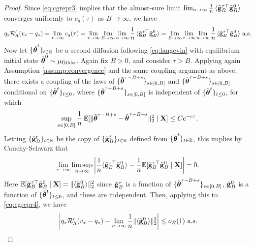 \begin{proof}
Since \eqref{eq:cgrepr3} implies that the almost-sure limit
$\lim_{n \to \infty} \frac{1}{n}\,\langle
\tilde {\mathbf{g}}_B^{\tau\top}\tilde {\mathbf{g}}_B^0 \rangle$ converges uniformly to
$c_g(\tau)$ as $B \to \infty$, we have
\begin{equation}\label{eq:cgrepr4}
q_*\mathcal{R}_\Lambda'(v_*-q_*)=\lim_{\tau \to \infty} c_g(\tau)=
\lim_{\tau \to \infty} \lim_{B \to \infty}
\lim_{n \to \infty}
\frac{1}{n}\,\langle \tilde {\mathbf{g}}_B^{\tau\top}\tilde {\mathbf{g}}_B^0 \rangle
=\lim_{B \to \infty}
\lim_{\tau \to \infty} \lim_{n \to \infty}
\frac{1}{n}\,\langle \tilde {\mathbf{g}}_B^{\tau\top}\tilde {\mathbf{g}}_B^0 \rangle \text{ a.s.}
\end{equation}
Now let $\{\check {\boldsymbol{\theta}}^t\}_{t \in \mathbb{R}}$ be a second diffusion following
\eqref{eq:langevin} with equilibrium
initial state $\check {\boldsymbol{\theta}}^0 \sim \mu_{\mathrm{Gibbs}}$. Again fix $B>0$, and
consider $\tau>B$. Applying again
Assumption \ref{assump:convergence} and the same coupling argument as above,
there exists a coupling of the laws of $\{\tilde {\boldsymbol{\theta}}^{\tau-B+s}\}_{s \in
[0,B]}$ and $\{\check{\boldsymbol{\theta}}^{\tau-B+s}\}_{s \in [0,B]}$ 
conditional on $\{\tilde{\boldsymbol{\theta}}^t\}_{t \leq 0}$,
where $\{\check{\boldsymbol{\theta}}^{\tau-B+s}\}_{s \in [0,B]}$ is independent of
$\{\tilde{\boldsymbol{\theta}}^t\}_{t \leq 0}$, for which
\[\sup_{s \in [0,B]} \frac{1}{n}\,\mathbb{E}[\|\tilde {\boldsymbol{\theta}}^{\tau-B+s}
-\check{\boldsymbol{\theta}}^{\tau-B+s}\|_2^2 \mid \mathbf{X}] \leq Ce^{-c\tau}.\]
Letting $\{\check {\mathbf{g}}_B^t\}_{t \in \mathbb{R}}$ be the copy of $\{\tilde {\mathbf{g}}_B^t\}_{t \in
\mathbb{R}}$ defined from $\{\check {\boldsymbol{\theta}}^t\}_{t \in \mathbb{R}}$,
this implies by Cauchy-Schwarz that
\[\lim_{\tau \to \infty} \limsup_{n \to \infty}
\left|\frac{1}{n}\langle \tilde {\mathbf{g}}_B^{\tau\top}\tilde {\mathbf{g}}_B^0 \rangle
-\frac{1}{n}\mathbb{E}[\check {\mathbf{g}}_B^{\tau\top}\tilde {\mathbf{g}}_B^0 \mid \mathbf{X}]\right|=0.\]
Here $\mathbb{E}[\check {\mathbf{g}}_B^{\tau\top}\tilde {\mathbf{g}}_B^0 \mid \mathbf{X}]=
\|\langle \tilde {\mathbf{g}}_B^0 \rangle\|_2^2$ since
$\check {\mathbf{g}}_B^\tau$ is a function of $\{\check {\boldsymbol{\theta}}^{\tau-B+s}\}_{s \in
[0,B]}$, $\tilde {\mathbf{g}}_B^0$ is a function of $\{\tilde {\boldsymbol{\theta}}^t\}_{t \leq 0}$, and
these are independent. Then, applying this to \eqref{eq:cgrepr4}, we have
\begin{equation}\label{eq:cgrepr5}
\left|q_*\mathcal{R}_\Lambda'(v_*-q_*)-\lim_{n \to \infty}
\frac{1}{n}\|\langle \tilde {\mathbf{g}}_B^0 \rangle\|_2^2\right| \leq o_B(1) \text{ a.s.}
\end{equation}


\end{proof}
